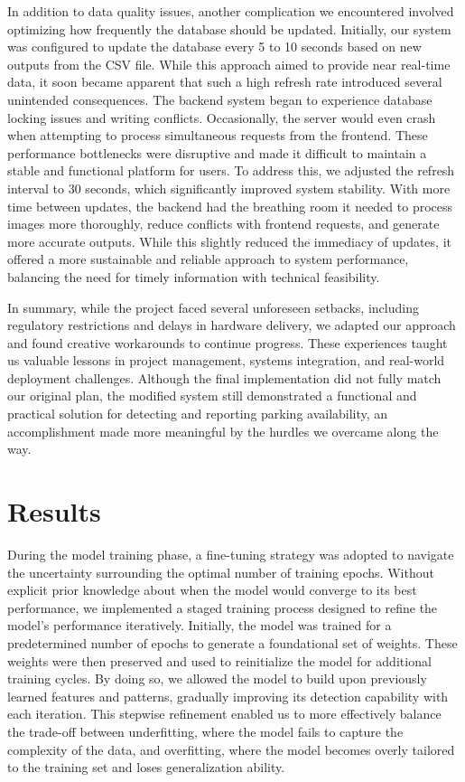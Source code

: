 \documentclass[conference]{IEEEtran}
\begin{document}
In addition to data quality issues, another complication we encountered involved optimizing how frequently the database should be updated. Initially, our system was configured to update the database every 5 to 10 seconds based on new outputs from the CSV file. While this approach aimed to provide near real-time data, it soon became apparent that such a high refresh rate introduced several unintended consequences. The backend system began to experience database locking issues and writing conflicts. Occasionally, the server would even crash when attempting to process simultaneous requests from the frontend. These performance bottlenecks were disruptive and made it difficult to maintain a stable and functional platform for users. To address this, we adjusted the refresh interval to 30 seconds, which significantly improved system stability. With more time between updates, the backend had the breathing room it needed to process images more thoroughly, reduce conflicts with frontend requests, and generate more accurate outputs. While this slightly reduced the immediacy of updates, it offered a more sustainable and reliable approach to system performance, balancing the need for timely information with technical feasibility.

In summary, while the project faced several unforeseen setbacks, including regulatory restrictions and delays in hardware delivery, we adapted our approach and found creative workarounds to continue progress. These experiences taught us valuable lessons in project management, systems integration, and real-world deployment challenges. Although the final implementation did not fully match our original plan, the modified system still demonstrated a functional and practical solution for detecting and reporting parking availability, an accomplishment made more meaningful by the hurdles we overcame along the way.


\section{Results}

During the model training phase, 
a fine-tuning strategy was adopted to navigate the uncertainty surrounding the optimal number of training epochs. 
Without explicit prior knowledge about when the model would converge to its best performance, 
we implemented a staged training process designed to refine the model's performance iteratively. 
Initially, 
the model was trained for a predetermined number of epochs to generate a foundational set of weights. 
These weights were then preserved and used to reinitialize the model for additional training cycles. 
By doing so, 
we allowed the model to build upon previously learned features and patterns, 
gradually improving its detection capability with each iteration. 
This stepwise refinement enabled us to more effectively balance the trade-off between underfitting, 
where the model fails to capture the complexity of the data, 
and overfitting, 
where the model becomes overly tailored to the training set and loses generalization ability.
\end{document}
